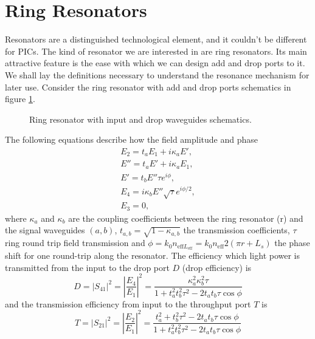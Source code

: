 \documentclass[12pt,twoside,english]{book}
\renewcommand{\~}{\perispomeni}%
\numberwithin{equation}{section}
\numberwithin{figure}{section}
\begin{document}
\section{Ring Resonators}
Resonators are a distinguished technological element, and it couldn't be different for PICs. The kind of resonator we are interested in are ring resonators. Its main attractive feature is the ease with which we can design add and drop ports to it. We shall lay the definitions necessary to understand the resonance mechanism for later use.
Consider the ring resonator with add and drop ports schematics\cite{Little:1997p39,Vorckel:2003p86} in figure \ref{fig:ring-resonator}.
\begin{figure}[H]
\center{}\caption{Ring resonator with input and drop waveguides schematics.\label{fig:ring-resonator}}
\end{figure}
The following equations describe how the field amplitude and phase
\begin{subequations}\begin{eqnarray}
E_{2}=t_{a}E_{1}+i\kappa_{a}E',\\
E''=t_{a}E'+i\kappa_{a}E_{1},\\
E'=t_{b}E''\tau e^{i\phi},\\
E_{4}=i\kappa_{b}E''\sqrt{\tau}e^{i\phi/2},\\
E_{3}=0,
\end{eqnarray}\end{subequations}
where $\kappa_a$ and $\kappa_b$ are the coupling coefficients between the ring resonator (r) and the signal waveguides $(a,b)$, $t_{a,b}=\sqrt{1-\kappa_{a,b}}$ the transmission coefficients, $\tau$ ring round trip field transmission and $\phi=k_0 n_{\text{eff}L_{\text{eff}}}=k_0 n_{\text{eff}}2\left(\pi r+L_s\right)$ the phase shift for one round-trip along the resonator.
The efficiency which light power is transmitted from the input to the drop port $D$ (drop efficiency) is 
\begin{equation}
D=\left|S_{41}\right|^{2}=\left|\frac{E_{4}}{E_{1}}\right|^{2}=\frac{\kappa_{a}^{2}\kappa_{b}^{2}\tau}{1+t_{a}^{2}t_{b}^{2}\tau^2-2t_{a}t_{b}\tau\cos\phi}
\label{eq:drop efficiency}
\end{equation}
and the transmission efficiency from input to the throughput port $T$ is
\begin{equation}
T=\left|S_{21}\right|^{2}=\left|\frac{E_{2}}{E_{1}}\right|^{2}=\frac{t_{a}^{2}+t_{b}^{2}\tau^{2}-2t_{a}t_{b}\tau\cos\phi}{1+t_{a}^{2}t_{b}^{2}\tau^2-2t_{a}t_{b}\tau\cos\phi}
\end{equation}
\end{document}
